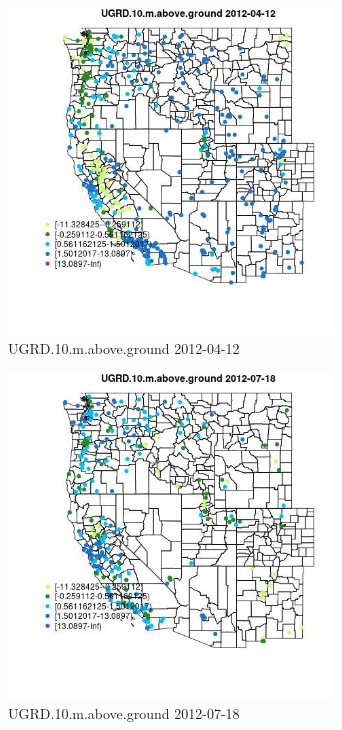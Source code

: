 \begin{figure} 
\centering  
\includegraphics[width=0.77\textwidth]{Code_Outputs/Report_ML_input_PM25_Step4_part_e_de_duplicated_aves_compiled_2019-05-14wNAs_MapObsUGRD10maboveground2012-04-12.jpg} 
\caption{\label{fig:Report_ML_input_PM25_Step4_part_e_de_duplicated_aves_compiled_2019-05-14wNAsMapObsUGRD10maboveground2012-04-12}UGRD.10.m.above.ground 2012-04-12} 
\end{figure} 
 

\begin{figure} 
\centering  
\includegraphics[width=0.77\textwidth]{Code_Outputs/Report_ML_input_PM25_Step4_part_e_de_duplicated_aves_compiled_2019-05-14wNAs_MapObsUGRD10maboveground2012-07-18.jpg} 
\caption{\label{fig:Report_ML_input_PM25_Step4_part_e_de_duplicated_aves_compiled_2019-05-14wNAsMapObsUGRD10maboveground2012-07-18}UGRD.10.m.above.ground 2012-07-18} 
\end{figure} 
 

